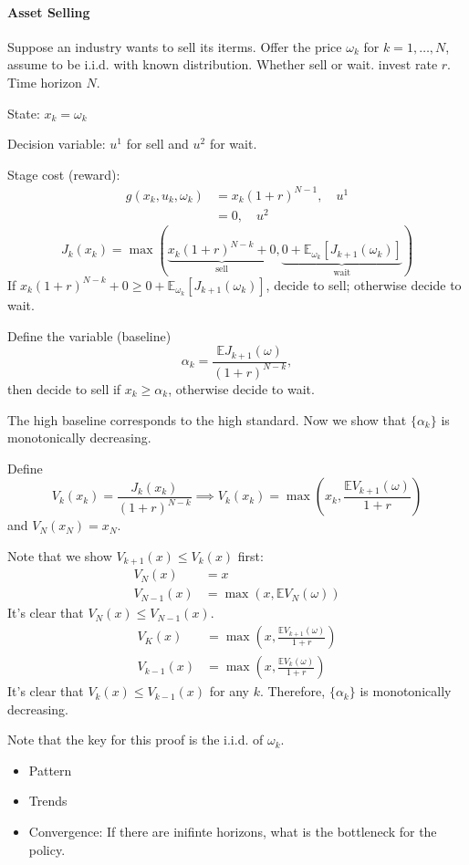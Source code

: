 \paragraph{Asset Selling}
Suppose an industry wants to sell its iterms.
Offer the price $\omega_k$ for $k=1,\dots,N$, assume to be i.i.d. with known distribution.
Whether sell or wait.
invest rate $r$.
Time horizon $N$.

State: $x_k=\omega_k$

Decision variable: $u^1$ for sell and $u^2$ for wait.

Stage cost (reward): 
\[
\begin{aligned}
g(x_k,u_k,\omega_k) &= x_k(1+r)^{N-1},\quad u^1\\
&=0,\quad u^2
\end{aligned}
\]
\[
J_k(x_k)
=
\max\left(
\underbrace{x_k(1+r)^{N-k}+0}_{\text{sell}},
\underbrace{
0+\mathbb{E}_{\omega_k}[J_{k+1}(\omega_k)]
}_{\text{wait}}
\right)
\]
If $x_k(1+r)^{N-k}+0\ge 0+\mathbb{E}_{\omega_k}[J_{k+1}(\omega_k)]$, decide to sell; otherwise decide to wait.

Define the variable (baseline)
\[
\alpha_k=\frac{\mathbb{E}J_{k+1}(\omega)}{(1+r)^{N-k}},
\]
then decide to sell if $x_k\ge\alpha_k$, otherwise decide to wait.

The high baseline corresponds to the high standard. Now we show that $\{\alpha_k\}$ is monotonically decreasing.

Define 
\[
V_k(x_k) = \frac{J_k(x_k)}{(1+r)^{N-k}}
\implies
V_k(x_k) = \max\left(x_k,\frac{\mathbb{E}V_{k+1}(\omega)}{1+r}\right)
\]
and $V_N(x_N) = x_N$.

Note that we show $V_{k+1}(x)\le V_k(x)$ first:
\begin{align*}
V_N(x)&=x\\
V_{N-1}(x)&=\max(x,\mathbb{E}V_N(\omega))
\end{align*}
It's clear that $V_N(x)\le V_{N-1}(x)$.
\begin{align*}
V_K(x)&=\max(x,\frac{\mathbb{E}V_{k+1}(\omega)}{1+r})\\
V_{k-1}(x)&=\max(x,\frac{\mathbb{E}V_{k}(\omega)}{1+r})
\end{align*}
It's clear that $V_k(x)\le V_{k-1}(x)$ for any $k$. Therefore,  $\{\alpha_k\}$ is monotonically decreasing.

Note that the key for this proof is the i.i.d. of $\omega_k$.

\begin{itemize}
\item
Pattern
\item
Trends
\item
Convergence: If there are inifinte horizons, what is the bottleneck for the policy.
\end{itemize}


